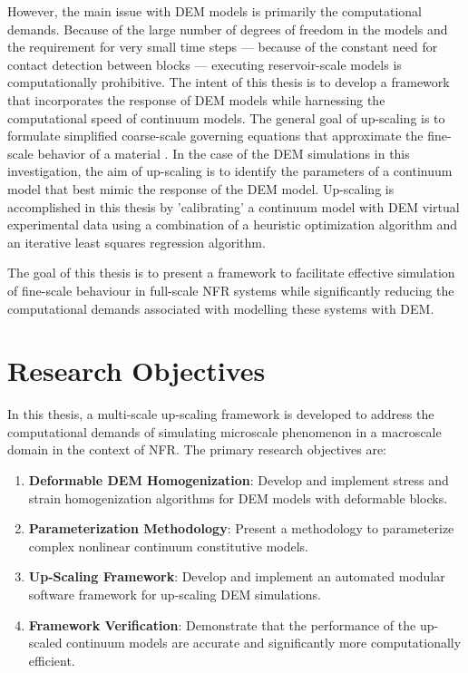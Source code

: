 However, the main issue with DEM models is primarily the computational demands. Because of the large number of degrees of freedom in the models and the requirement for very small time steps --- because of the constant need for contact detection between blocks --- executing reservoir-scale models is computationally prohibitive. The intent of this thesis is to develop a framework that incorporates the response of DEM models while harnessing the computational speed of continuum models. The general goal of up-scaling is to formulate simplified coarse-scale governing equations that approximate the fine-scale behavior of a material \citep{Geers_2010}. In the case of the DEM simulations in this investigation, the aim of up-scaling is to identify the parameters of a continuum model that best mimic the response of the DEM model.  Up-scaling is accomplished in this thesis by 'calibrating' a continuum model with DEM virtual experimental data using a combination of a heuristic optimization algorithm and an iterative least squares regression algorithm.

The goal of this thesis is to present a framework to facilitate effective simulation of fine-scale behaviour in full-scale NFR systems while significantly reducing the computational demands associated with modelling these systems with DEM. 

\section{Research Objectives}

In this thesis, a multi-scale up-scaling framework is developed to address the computational demands of simulating microscale phenomenon in a macroscale domain in the context of NFR. The primary research objectives are:

\begin{enumerate}
\item \textbf{Deformable DEM Homogenization}: Develop and implement stress and strain homogenization algorithms for DEM models with deformable blocks.
\item \textbf{Parameterization Methodology}: Present a methodology to parameterize complex nonlinear continuum constitutive models.
\item \textbf{Up-Scaling Framework}: Develop and implement an automated modular software framework for up-scaling DEM simulations.
\item \textbf{Framework Verification}: Demonstrate that the performance of the up-scaled continuum models are accurate and significantly more computationally efficient.
\end{enumerate}


